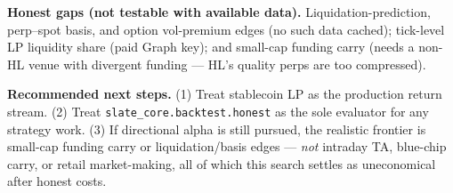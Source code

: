 \documentclass[11pt,a4paper]{article}
\begin{document}
\textbf{Honest gaps (not testable with available data).} Liquidation-prediction, perp--spot basis, and option vol-premium edges (no such data cached); tick-level LP liquidity share (paid Graph key); and small-cap funding carry (needs a non-HL venue with divergent funding --- HL's quality perps are too compressed).

\textbf{Recommended next steps.} (1) Treat stablecoin LP as the production return stream. (2) Treat \texttt{slate\_core.backtest.honest} as the sole evaluator for any strategy work. (3) If directional alpha is still pursued, the realistic frontier is small-cap funding carry or liquidation/basis edges --- \emph{not} intraday TA, blue-chip carry, or retail market-making, all of which this search settles as uneconomical after honest costs.
\end{document}
